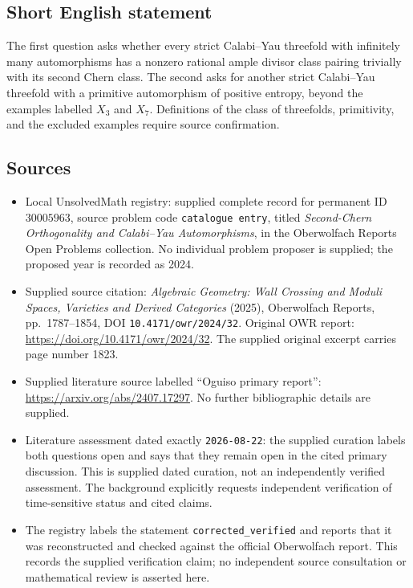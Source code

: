 \documentclass[11pt]{article}
\begin{document}
\subsection{Short English statement}
The first question asks whether every strict Calabi--Yau threefold with infinitely many automorphisms has a nonzero rational ample divisor class pairing trivially with its second Chern class. The second asks for another strict Calabi--Yau threefold with a primitive automorphism of positive entropy, beyond the examples labelled \(X_3\) and \(X_7\). Definitions of the class of threefolds, primitivity, and the excluded examples require source confirmation.
\subsection{Sources}
\begin{itemize}
\item Local UnsolvedMath registry: supplied complete record for permanent ID \(30005963\), source problem code \texttt{catalogue entry}, titled \emph{Second-Chern Orthogonality and Calabi--Yau Automorphisms}, in the Oberwolfach Reports Open Problems collection. No individual problem proposer is supplied; the proposed year is recorded as 2024.
\item Supplied source citation: \emph{Algebraic Geometry: Wall Crossing and Moduli Spaces, Varieties and Derived Categories} (2025), Oberwolfach Reports, pp.~1787--1854, DOI \texttt{10.4171/owr/2024/32}. Original OWR report: \url{https://doi.org/10.4171/owr/2024/32}. The supplied original excerpt carries page number 1823.
\item Supplied literature source labelled ``Oguiso primary report'': \url{https://arxiv.org/abs/2407.17297}. No further bibliographic details are supplied.
\item Literature assessment dated exactly \texttt{2026-08-22}: the supplied curation labels both questions open and says that they remain open in the cited primary discussion. This is supplied dated curation, not an independently verified assessment. The background explicitly requests independent verification of time-sensitive status and cited claims.
\item The registry labels the statement \texttt{corrected\_verified} and reports that it was reconstructed and checked against the official Oberwolfach report. This records the supplied verification claim; no independent source consultation or mathematical review is asserted here.
\end{itemize}
\end{document}
